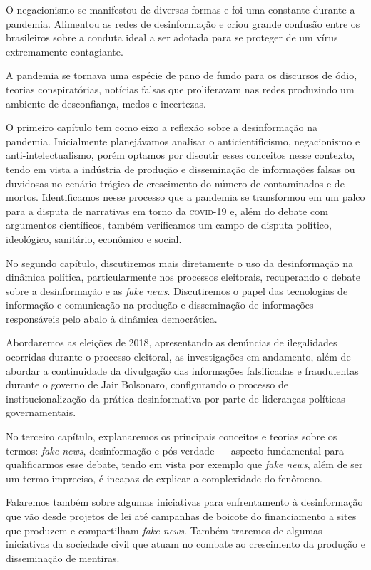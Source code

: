 O negacionismo se manifestou de diversas formas e foi uma constante
durante a pandemia. Alimentou as redes de desinformação e criou
grande confusão entre os brasileiros sobre a conduta ideal a ser adotada
para se proteger de um vírus extremamente contagiante.

A pandemia se tornava uma espécie de pano de fundo para os discursos de
ódio, teorias conspiratórias, notícias falsas que proliferavam nas redes
produzindo um ambiente de desconfiança, medos e incertezas.

O primeiro capítulo tem como eixo a reflexão sobre a desinformação na pandemia.
Inicialmente planejávamos analisar o anticientificismo, negacionismo e
anti-intelectualismo, porém optamos por discutir esses conceitos nesse
contexto, tendo em vista a indústria de produção e disseminação de
informações falsas ou duvidosas no cenário trágico de crescimento do
número de contaminados e de mortos. Identificamos nesse processo que a
pandemia se transformou em um palco para a disputa de narrativas em
torno da \textsc{covid-19} e, além do debate com argumentos científicos, também
verificamos um campo de disputa político, ideológico, sanitário,
econômico e social.

No segundo capítulo, discutiremos mais diretamente o uso da desinformação
na dinâmica política, particularmente nos processos eleitorais,
recuperando o debate sobre a desinformação e as \textit{fake news}. Discutiremos o
papel das tecnologias de informação e comunicação na produção e
disseminação de informações responsáveis pelo abalo à dinâmica
democrática.

Abordaremos as eleições de 2018, apresentando as denúncias de
ilegalidades ocorridas durante o processo eleitoral, as investigações em
andamento, além de abordar a continuidade da divulgação das informações
falsificadas e fraudulentas durante o governo de Jair Bolsonaro,
configurando o processo de institucionalização da prática desinformativa
por parte de lideranças políticas governamentais.

No terceiro capítulo, explanaremos os principais conceitos e teorias sobre os
termos: \textit{fake news}, desinformação e pós-verdade --- aspecto fundamental para
qualificarmos esse debate, tendo em vista por exemplo que \textit{fake news}, além de ser um
termo impreciso, é incapaz de explicar a complexidade do fenômeno.

Falaremos também sobre algumas iniciativas para enfrentamento à
desinformação que vão desde projetos de lei até campanhas de boicote do
financiamento a sites que produzem e compartilham \textit{fake news}. Também
traremos de algumas iniciativas da sociedade civil que atuam no combate ao
crescimento da produção e disseminação de mentiras.

